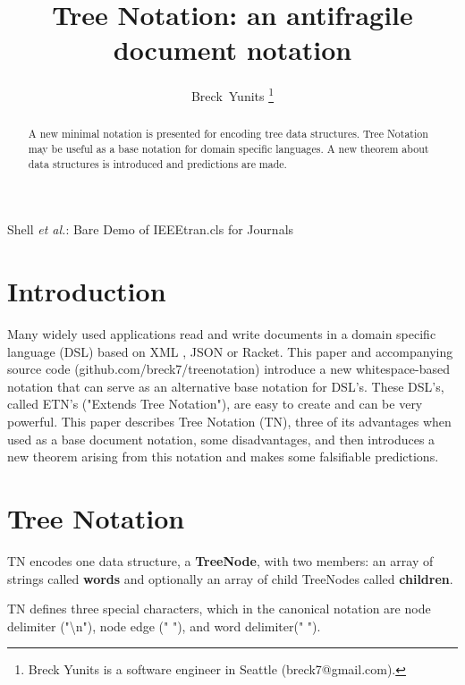 \documentclass[journal]{IEEEtran}
\begin{document}
\title{Tree Notation: an antifragile document notation}

\author{Breck~Yunits%
\thanks{Breck Yunits is a software engineer in Seattle (breck7@gmail.com).}%
}

%
{Shell \MakeLowercase{\textit{et al.}}: Bare Demo of IEEEtran.cls for Journals}

\maketitle


\begin{abstract}
A new minimal notation is presented for encoding tree data structures. Tree Notation may be useful as a base notation for domain specific languages. A new theorem about data structures is introduced and predictions are made.

\end{abstract}

\IEEEpeerreviewmaketitle

\section{Introduction}

Many widely used applications read and write documents in a domain specific language (DSL) based on XML \cite{Bray}, JSON \cite{Crockford} or Racket. This paper and accompanying source code (github.com/breck7/treenotation) introduce a new whitespace-based notation that can serve as an alternative base notation for DSL's. These DSL's, called ETN's ("Extends Tree Notation"), are easy to create and can be very powerful. This paper describes Tree Notation (TN), three of its advantages when used as a base document notation, some disadvantages, and then introduces a new theorem arising from this notation and makes some falsifiable predictions.

\section{Tree Notation}

TN encodes one data structure, a \textbf{TreeNode}, with two members: an array of strings called \textbf{words} and optionally an array of child TreeNodes called \textbf{children}.

TN defines three special characters, which in the canonical notation are node delimiter ("\textbackslash n"), node edge (" "), and word delimiter(" ").
\end{document}
